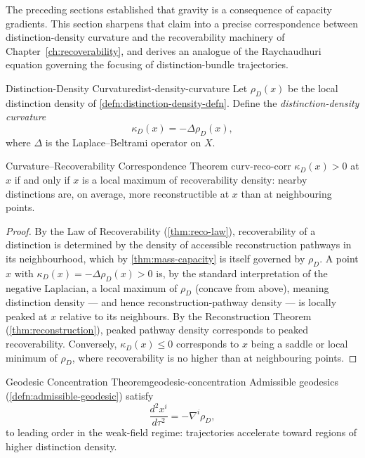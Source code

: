 \documentclass[12pt,twoside,openright]{book}
\begin{document}
The preceding sections established that gravity is a
consequence of capacity gradients. This section sharpens
that claim into a precise correspondence between
distinction-density curvature and the recoverability
machinery of Chapter~\ref{ch:recoverability}, and derives
an analogue of the Raychaudhuri equation governing the
focusing of distinction-bundle trajectories.

\begin{definition}{Distinction-Density Curvature}{dist-density-curvature}
  Let $\rho_D(x)$ be the local distinction density of
  \cref{defn:distinction-density-defn}. Define the
  \emph{distinction-density curvature}
  \[
    \kappa_D(x) = -\Delta\rho_D(x),
  \]
  where $\Delta$ is the Laplace--Beltrami operator on $X$.
\end{definition}

\begin{theorem}{Curvature--Recoverability Correspondence Theorem}%
  {curv-reco-corr}
  $\kappa_D(x) > 0$ at $x$ if and only if $x$ is a local
  maximum of recoverability density: nearby distinctions
  are, on average, more reconstructible at $x$ than at
  neighbouring points.
\end{theorem}

\begin{proof}
  By the Law of Recoverability (\cref{thm:reco-law}),
  recoverability of a distinction is determined by the
  density of accessible reconstruction pathways in its
  neighbourhood, which by \cref{thm:mass-capacity} is itself
  governed by $\rho_D$. A point $x$ with $\kappa_D(x) =
  -\Delta\rho_D(x) > 0$ is, by the standard interpretation of
  the negative Laplacian, a local maximum of $\rho_D$
  (concave from above), meaning distinction density --- and
  hence reconstruction-pathway density --- is locally
  peaked at $x$ relative to its neighbours. By the
  Reconstruction Theorem (\cref{thm:reconstruction}), peaked
  pathway density corresponds to peaked recoverability.
  Conversely, $\kappa_D(x) \le 0$ corresponds to $x$ being a
  saddle or local minimum of $\rho_D$, where recoverability
  is no higher than at neighbouring points.
\end{proof}

\begin{theorem}{Geodesic Concentration Theorem}{geodesic-concentration}
  Admissible geodesics (\cref{defn:admissible-geodesic})
  satisfy
  \[
    \frac{d^2 x^i}{d\tau^2} = -\nabla^i \rho_D,
  \]
  to leading order in the weak-field regime: trajectories
  accelerate toward regions of higher distinction density.
\end{theorem}
\end{document}
